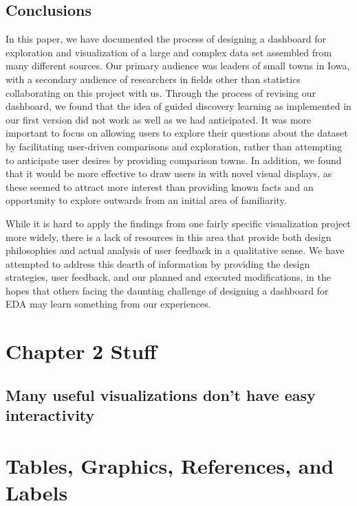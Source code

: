 \documentclass[print]{nuthesis}
\begin{document}
\hypertarget{conclusions}{%
\section{Conclusions}\label{conclusions}}

In this paper, we have documented the process of designing a dashboard for exploration and visualization of a large and complex data set assembled from many different sources. Our primary audience was leaders of small towns in Iowa, with a secondary audience of researchers in fields other than statistics collaborating on this project with us. Through the process of revising our dashboard, we found that the idea of guided discovery learning as implemented in our first version did not work as well as we had anticipated. It was more important to focus on allowing users to explore their questions about the dataset by facilitating user-driven comparisons and exploration, rather than attempting to anticipate user desires by providing comparison towns. In addition, we found that it would be more effective to draw users in with novel visual displays, as these seemed to attract more interest than providing known facts and an opportunity to explore outwards from an initial area of familiarity.

While it is hard to apply the findings from one fairly specific visualization project more widely, there is a lack of resources in this area that provide both design philosophies and actual analysis of user feedback in a qualitative sense. We have attempted to address this dearth of information by providing the design strategies, user feedback, and our planned and executed modifications, in the hopes that others facing the daunting challenge of designing a dashboard for EDA may learn something from our experiences.

\hypertarget{math-sci}{%
\chapter{Chapter 2 Stuff}\label{math-sci}}

\hypertarget{many-useful-visualizations-dont-have-easy-interactivity}{%
\section{Many useful visualizations don't have easy interactivity}\label{many-useful-visualizations-dont-have-easy-interactivity}}

\hypertarget{ref-labels}{%
\chapter{Tables, Graphics, References, and Labels}\label{ref-labels}}
\end{document}
